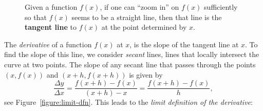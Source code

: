 \begin{figure*}
\caption{Given a function $f(x)$, if one can ``zoom in''
on $f(x)$ sufficiently so that $f(x)$ seems to be a straight line,
then that line is the \textbf{tangent line} to $f(x)$ at the point
determined by $x$.}
\label{figure:informal-tangent}
\end{figure*}


The \textit{derivative} of a function $f(x)$ at $x$, is the slope of
the tangent line at $x$. To find the slope of this line, we consider
\textit{secant} lines, lines that locally intersect the curve at two
points.  The slope of any secant line that passes through the points
$(x,f(x))$ and $(x+h, f(x+h))$ is given by
\[
\frac{\Delta y}{\Delta x}=\frac{f(x+h) -f(x)}{(x+h)-x} = \frac{f(x+h)-f(x)}{h},
\]
see Figure~\ref{figure:limit-dfn}. This leads to the \textit{limit definition of the derivative}:


